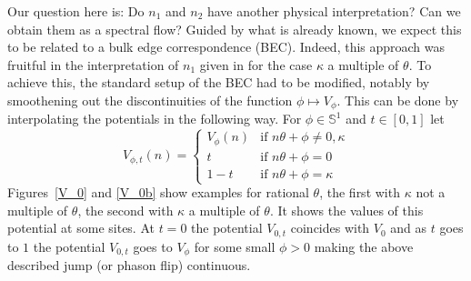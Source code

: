 \documentclass[11pt]{amsart}
\newcommand{\cut}{\kappa}
\begin{document}
Our question here is: Do $n_1$ and $n_2$ have another physical interpretation? Can we obtain them as a spectral flow? Guided by what is already known, we expect this to be related to a bulk edge correspondence (BEC). Indeed, this approach was fruitful in the interpretation of $n_1$ given in \cite{kellendonk_prodan} for the case $\cut$ a multiple of $\theta$. To achieve this, the standard setup of the BEC had to be modified, notably by smoothening out the discontinuities of the function $\phi\mapsto V_\phi$. This can be done by interpolating the potentials in the following way.
For $\phi\in \mathbb S^1$ and $t\in [0,1]$ let
$$V_{\phi, t}(n) = \left\{\begin{array}{ll}
V_\phi(n) & \mbox{if } n\theta+\phi \neq 0,\cut \\
t & \mbox{if } n\theta+\phi = 0 \\
1-t & \mbox{if } n\theta+\phi =\cut
\end{array}
\right.$$
Figures~\ref{V_0} and \ref{V_0b} show examples for rational $\theta$, the first with $\cut$ not a multiple of $\theta$, the second with $\cut$ a multiple of $\theta$. It shows the values of this potential at some sites. At $t=0$ the potential  $V_{0,t}$ coincides with $V_0$ and 
as $t$ goes to $1$ the potential  $V_{0,t}$ goes to $V_\phi$ for some small $\phi>0$ making the above described jump (or phason flip) continuous. 
\end{document}

